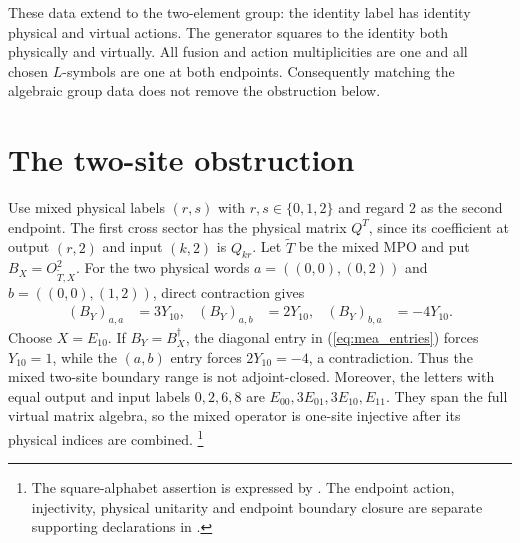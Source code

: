 \documentclass{article}
\begin{document}
These data extend to the two-element group: the identity label has
identity physical and virtual actions. The generator squares to the
identity both physically and virtually. All fusion and action
multiplicities are one and all chosen $L$-symbols are one at both
endpoints. Consequently matching the algebraic group data does not
remove the obstruction below.

\section{The two-site obstruction}
Use mixed physical labels $(r,s)$ with $r,s\in\{0,1,2\}$ and regard
$2$ as the second endpoint. The first cross sector has the physical
matrix $Q^T$, since its coefficient at output $(r,2)$ and input
$(k,2)$ is $Q_{kr}$. Let $\widetilde T$ be the mixed MPO and put
$B_X=O^2_{\widetilde T,X}$. For the two physical words
$a=((0,0),(0,2))$ and $b=((0,0),(1,2))$, direct contraction gives
\begin{align}
    (B_Y)_{a,a} & =3Y_{10},  &
    (B_Y)_{a,b} & =2Y_{10},  &
    (B_Y)_{b,a} & =-4Y_{10}.
    \label{eq:mea_entries}
\end{align}
Choose $X=E_{10}$. If $B_Y=B_X^\dagger$, the diagonal entry in
(\ref{eq:mea_entries}) forces $Y_{10}=1$, while the $(a,b)$ entry
forces $2Y_{10}=-4$, a contradiction. Thus the mixed two-site
boundary range is not adjoint-closed. Moreover, the letters with equal
output and input labels $0,2,6,8$ are $E_{00},3E_{01},3E_{10},E_{11}$.
They span the full virtual matrix algebra, so the mixed operator is
one-site injective after its physical indices are combined.
\footnote{The square-alphabet assertion is expressed by
    .
    The endpoint action, injectivity, physical unitarity and endpoint
    boundary closure are separate supporting declarations in
    .}
\end{document}
